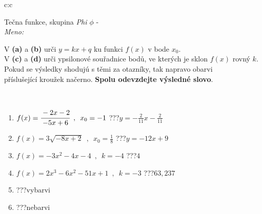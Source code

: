 \documentclass[10pt]{report}
\begin{document}
\newpage
\thispagestyle{empty}
\begin{tabular}{c:c}
\begin{minipage}[c][104.5mm][t]{0.5\linewidth}
\begin{center}
\vspace{7mm}
{\huge Tečna funkce, skupina \textit{Phi $\phi$} -}\\[5mm]
\textit{Meno:}\phantom{xxxxxxxxxxxxxxxxxxxxxxxxxxxxxxxxxxxxxxxxxxxxxxxxxxxxxxxxxxxxxxxxx}\\[5mm]
\begin{minipage}{0.95\linewidth}
\begin{center}
V \textbf{(a)} a \textbf{(b)} urči  $y = kx + q$ ku funkci $f(x)$ v bode $x_0$.\\V \textbf{(c)} a \textbf{(d)} urči ypsilonové souřadnice bodů, ve kterých je sklon $f(x)$ rovný $k$.\\Pokud se výsledky shodujú s těmi za otazníky, tak napravo obarvi\\příslušející kroužek načerno. \textbf{Spolu odevzdejte výsledné slovo}.
\end{center}
\end{minipage}
\\[1mm]
\begin{minipage}{0.79\linewidth}
\begin{center}
\begin{varwidth}{\linewidth}
\begin{enumerate}
\small
\item $f(x)=\cfrac{-2x-2}{-5x+6}\enspace , \enspace x_0=-1$\quad \dotfill\; ???\;\dotfill \quad $y = -\frac{2}{11}x-\frac{2}{11}$
\item $f(x)=3\sqrt{-8x+2}\enspace , \enspace x_0=\frac{1}{8}$\quad \dotfill\; ???\;\dotfill \quad $y = -12x+9$
\item $f(x)=-3x^2-4x-4\enspace , \enspace k=-4$\quad \dotfill\; ???\;\dotfill \quad $4$
\item $f(x)=2x^3-6x^2-51x+1\enspace , \enspace k=-3$\quad \dotfill\; ???\;\dotfill \quad $63 , 237$
\item \quad \dotfill\; ???\;\dotfill \quad vybarvi
\item \quad \dotfill\; ???\;\dotfill \quad nebarvi
\end{enumerate}
\end{varwidth}
\end{center}
\end{minipage}
\begin{minipage}{0.20\linewidth}

\end{minipage}
\end{center}
\end{minipage}
\end{tabular}
\end{document}
